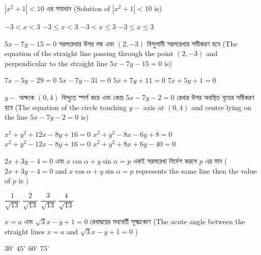 \documentclass[addpoints]{exam}
\begin{document}
\begin{questions}

 \question $ |x^2 +1|<10 $  এর সমাধান (Solution of $ |x^2 +1|<10 $ is)

\begin{oneparchoices}
\choice $ -3<x<3 $
\choice $ -3\le x < 3 $
\choice $ -3<x \le 3 $
\choice $ -3 \le x \le 3 $

\end{oneparchoices}

\question  $ 5x -7y -15=0 $ সরলরেখার উপর লম্ব এবং $ (2,-3) $ বিন্দুগামী সরলরেখার সমীকরণ হবে (The equation of the straight line passing through the point $ (2,-3) $ and perpendicular to the straight line $ 5x-7y-15=0 $ is)

\begin{oneparchoices}
\choice $ 7x-5y-29=0 $
\choice $ 5x-7y-31=0 $
\choice $ 5x+7y+11=0 $
\choice  $ 7x+5y+1=0 $

\end{oneparchoices}

\question  $ y- $ অক্ষকে $ (0,4) $ বিন্দুতে স্পর্শ করে এবং কেন্দ্র $ 5x-7y-2=0 $ রেখার উপর অবস্থিত বৃত্তের সমীকরণ হবে (The equation of the circle touching $ y- $ axis at $ (0,4) $ and centre lying on the line $ 5x-7y-2=0 $ is)

\begin{oneparchoices}
\choice $ x^2 +y^2 + 12x-8y+16=0 $
\choice $ x^2 +y^2 -8x-6y+8=0 $ \\
\hspace*{-.45cm} \choice $ x^2 +y^2 - 12x-8y+16=0 $
\choice  $ x^2 +y^2 + 8x +6y-40=0 $

\end{oneparchoices}

\question  $ 2x +3y -4=0 $ এবং $ x\cos\alpha +y\sin\alpha= p$ একই সরলরেখা নির্দেশ করলে $ p $ এর মান ($ 2x +3y -4=0 $ and $ x\cos\alpha +y\sin\alpha= p$ represents the same line then the value of $ p $ is )

\begin{oneparchoices}
\choice $ \dfrac{1}{\sqrt{13}} $
\choice $ \dfrac{2}{\sqrt{13}} $
\choice $ \dfrac{3}{\sqrt{13}} $
\choice $ \dfrac{4}{\sqrt{13}} $

\end{oneparchoices}


\question  $ x=a $ এবং $ \sqrt{3}x-y+1=0 $ রেখাদ্বয়ের মধ্যবর্তী সূক্ষ্মকোণ (The acute angle between the straight lines $ x=a $ and $ \sqrt{3}x-y+1=0 $ )

\begin{oneparchoices}
\choice $ 30^{\circ} $
\choice $ 45^{\circ} $
\choice $ 60^{\circ} $
\choice $ 75^{\circ} $


\end{oneparchoices}
\end{questions}
\end{document}
